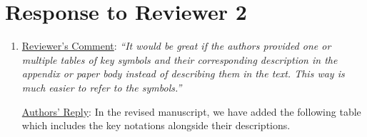 \documentclass[12pt,draftclsnofoot,onecolumn]{IEEEtran}
\begin{document}
\section{Response to Reviewer 2}
\begin{enumerate}


\item \underline{Reviewer's Comment}: \textit{``It would be great if the authors provided one or multiple tables of key symbols and their corresponding description in the appendix or paper body instead of describing them in the text. This way is much easier to refer to the symbols.''} \newline

\underline{Authors' Reply}: In the revised manuscript, we have added the following table which includes the key notations alongside their descriptions. 

\setcounter{table}{0}


\end{enumerate}
\end{document}
